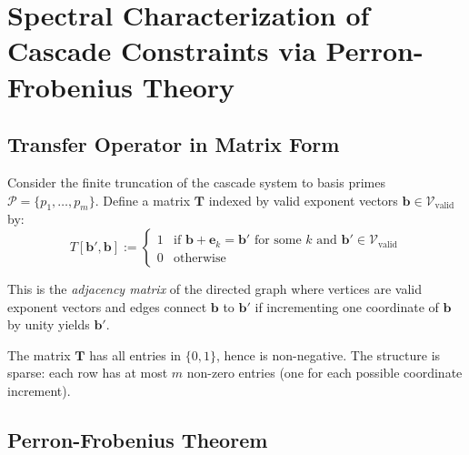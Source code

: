 \section{Spectral Characterization of Cascade Constraints via Perron-Frobenius Theory}
\label{sec:spectral-characterization-rigorous}

\subsection{Transfer Operator in Matrix Form}
\label{subsec:transfer-matrix}

\begin{definition}
Consider the finite truncation of the cascade system to basis primes $\mathcal{P} = \{p_1, \ldots, p_m\}$. Define a matrix $\mathbf{T}$ indexed by valid exponent vectors $\mathbf{b} \in \mathcal{V}_{\text{valid}}$ by:
\begin{equation}
T[\mathbf{b}', \mathbf{b}] := \begin{cases}
1 & \text{if } \mathbf{b} + \mathbf{e}_k = \mathbf{b}' \text{ for some } k \text{ and } \mathbf{b}' \in \mathcal{V}_{\text{valid}} \\
0 & \text{otherwise}
\end{cases}
\end{equation}

This is the \emph{adjacency matrix} of the directed graph where vertices are valid exponent vectors and edges connect $\mathbf{b}$ to $\mathbf{b}'$ if incrementing one coordinate of $\mathbf{b}$ by unity yields $\mathbf{b}'$.
\end{definition}

\begin{observation}
The matrix $\mathbf{T}$ has all entries in $\{0, 1\}$, hence is non-negative. The structure is sparse: each row has at most $m$ non-zero entries (one for each possible coordinate increment).
\end{observation}

\subsection{Perron-Frobenius Theorem}
\label{subsec:perron-frobenius}

